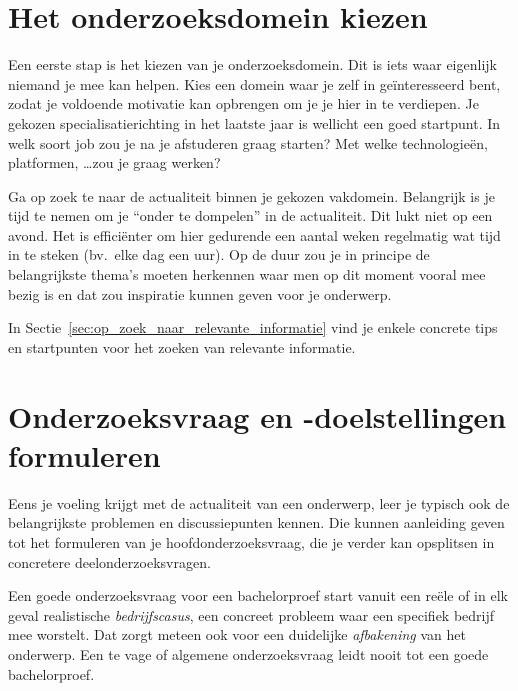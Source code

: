 \section{Het onderzoeksdomein kiezen}%
\label{sec:het_onderzoeksdomein_kiezen}

Een eerste stap is het kiezen van je onderzoeksdomein. Dit is iets waar eigenlijk niemand je mee kan helpen. Kies een domein waar je zelf in geïnteresseerd bent, zodat je voldoende motivatie kan opbrengen om je je hier in te verdiepen. Je gekozen specialisatierichting in het laatste jaar is wellicht een goed startpunt. In welk soort job zou je na je afstuderen graag starten? Met welke technologieën, platformen, \ldots zou je graag werken?

Ga op zoek te naar de actualiteit binnen je gekozen vakdomein. Belangrijk is je tijd te nemen om je ``onder te dompelen'' in de actualiteit. Dit lukt niet op een avond. Het is efficiënter om hier gedurende een aantal weken regelmatig wat tijd in te steken (bv.\ elke dag een uur). Op de duur zou je in principe de belangrijkste thema's moeten herkennen waar men op dit moment vooral mee bezig is en dat zou inspiratie kunnen geven voor je onderwerp.

In Sectie~\ref{sec:op_zoek_naar_relevante_informatie} vind je enkele concrete tips en startpunten voor het zoeken van relevante informatie.

\section{Onderzoeksvraag en -doelstellingen formuleren}%
\label{sec:onderzoeksvraag_formuleren}

Eens je voeling krijgt met de actualiteit van een onderwerp, leer je typisch ook de belangrijkste problemen en discussiepunten kennen. Die kunnen aanleiding geven tot het formuleren van je hoofdonderzoeksvraag, die je verder kan opsplitsen in concretere deelonderzoeksvragen.

Een goede onderzoeksvraag voor een bachelorproef start vanuit een reële of in elk geval realistische \textit{bedrijfscasus}, een concreet probleem waar een specifiek bedrijf mee worstelt. Dat zorgt meteen ook voor een duidelijke \textit{afbakening} van het onderwerp. Een te vage of algemene onderzoeksvraag leidt nooit tot een goede bachelorproef.

